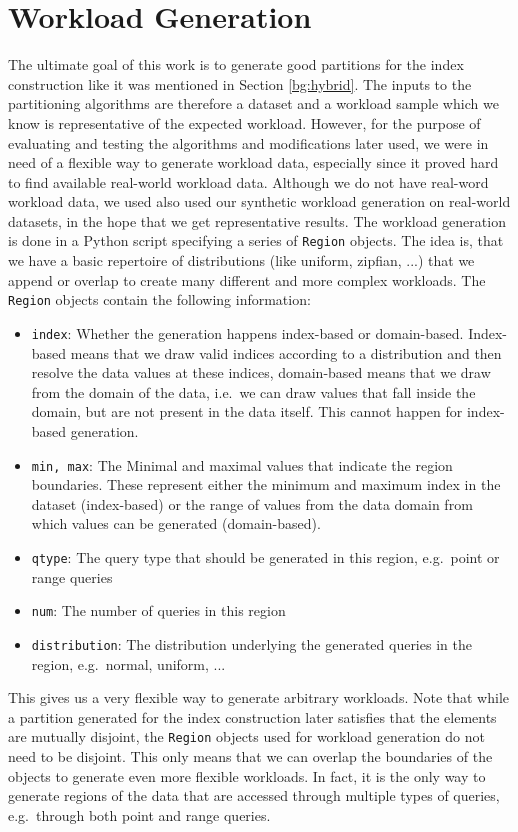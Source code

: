 \section{Workload Generation}
The ultimate goal of this work is to generate good partitions for the index construction like it was mentioned in Section \ref{bg:hybrid}. The inputs to the partitioning algorithms are therefore a dataset and a workload sample which we know is representative of the expected workload. However, for the purpose of evaluating and testing the algorithms and modifications later used, we were in need of a flexible way to generate workload data, especially since it proved hard to find available real-world workload data. Although we do not have real-word workload data, we used also used our synthetic workload generation on real-world datasets, in the hope that we get representative results. The workload generation is done in a Python script specifying a series of \verb|Region| objects. The idea is, that we have a basic repertoire of distributions (like uniform, zipfian, ...) that we append or overlap to create many different and more complex workloads. The \verb|Region| objects contain the following information:

\begin{itemize}
    \item \verb|index|: Whether the generation happens index-based or domain-based. Index-based means that we draw valid indices according to a distribution and then resolve the data values at these indices, domain-based means that we draw from the domain of the data, i.e.~we can draw values that fall inside the domain, but are not present in the data itself. This cannot happen for index-based generation.
    \item \verb|min, max|: The Minimal and maximal values that indicate the region boundaries. These represent either the minimum and maximum index in the dataset (index-based) or the range of values from the data domain from which values can be generated (domain-based).
    \item \verb|qtype|: The query type that should be generated in this region, e.g.~point or range queries
    \item \verb|num|: The number of queries in this region
    \item \verb|distribution|: The distribution underlying the generated queries in the region, e.g.~normal, uniform, ...
\end{itemize}

This gives us a very flexible way to generate arbitrary workloads. Note that while a partition generated for the index construction later satisfies that the elements are mutually disjoint, the \verb|Region| objects used for workload generation do not need to be disjoint. This only means that we can overlap the boundaries of the objects to generate even more flexible workloads. In fact, it is the only way to generate regions of the data that are accessed through multiple types of queries, e.g.~through both point and range queries. 

